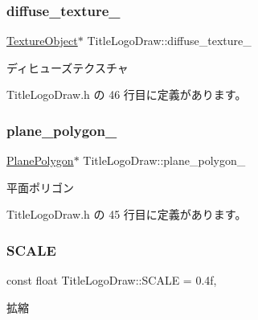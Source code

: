 \subsubsection{\texorpdfstring{diffuse\+\_\+texture\+\_\+}{diffuse\_texture\_}}
{\footnotesize\ttfamily \mbox{\hyperlink{class_texture_object}{Texture\+Object}}$\ast$ Title\+Logo\+Draw\+::diffuse\+\_\+texture\+\_\+\hspace{0.3cm}{\ttfamily [private]}}



ディヒューズテクスチャ 



 Title\+Logo\+Draw.\+h の 46 行目に定義があります。

\mbox{\label{class_title_logo_draw_a6088671088940a3580805df34c49cc52}} 
\subsubsection{\texorpdfstring{plane\+\_\+polygon\+\_\+}{plane\_polygon\_}}
{\footnotesize\ttfamily \mbox{\hyperlink{class_plane_polygon}{Plane\+Polygon}}$\ast$ Title\+Logo\+Draw\+::plane\+\_\+polygon\+\_\+\hspace{0.3cm}{\ttfamily [private]}}



平面ポリゴン 



 Title\+Logo\+Draw.\+h の 45 行目に定義があります。

\mbox{\label{class_title_logo_draw_a22181b94dc000a9fb9f68a21af9523ab}} 
\subsubsection{\texorpdfstring{S\+C\+A\+LE}{SCALE}}
{\footnotesize\ttfamily const float Title\+Logo\+Draw\+::\+S\+C\+A\+LE = 0.\+4f\hspace{0.3cm}{\ttfamily [static]}, {\ttfamily [private]}}



拡縮 



